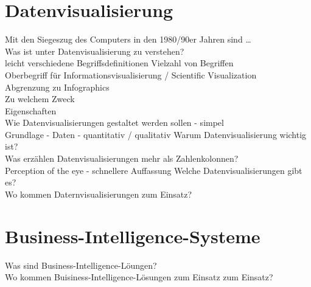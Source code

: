 \section{Datenvisualisierung}
Mit den Siegeszug des Computers in den 1980/90er Jahren sind \dots\\
Was ist unter Datenvisualisierung zu verstehen?\\
leicht verschiedene Begriffsdefinitionen
Vielzahl von Begriffen\\ 
Oberbegriff für Informationsvisualisierung / Scientific Visualization\\
Abgrenzung zu Infographics\\
Zu welchem Zweck\\
Eigenschaften\\
Wie Datenvisualisierungen gestaltet werden sollen - simpel\\
Grundlage - Daten - quantitativ / qualitativ
Warum Datenvisualisierung wichtig ist?\\
Was erzählen Datenvisualisierungen mehr als Zahlenkolonnen?\\
Perception of the eye - schnellere Auffassung
Welche Datenvisualisierungen gibt es?\\
Wo kommen Daternvisualisierungen zum Einsatz?\\






\clearpage
\section{Business-Intelligence-Systeme}

Was sind Business-Intelligence-Löungen?\\
Wo kommen Buisiness-Intelligence-Lösungen zum Einsatz zum Einsatz?
